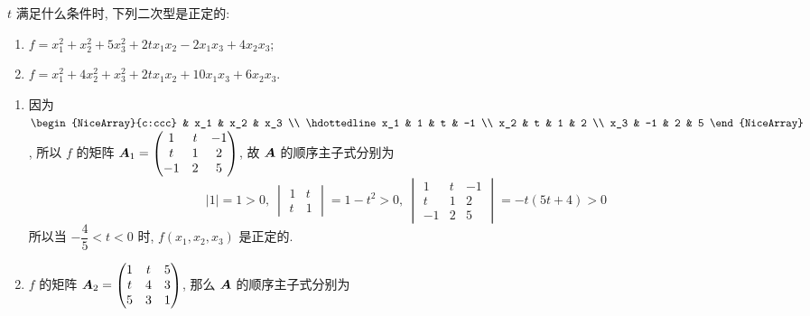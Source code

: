 \begin{example}
    $t$ 满足什么条件时, 下列二次型是正定的:
    \begin{enumerate}[label=(\arabic{*})]
        \item $f=x_1^2+x_2^2+5x_3^2+2tx_1x_2-2x_1x_3+4x_2x_3$;
        \item $f=x_1^2+4x_2^2+x_3^2+2tx_1x_2+10x_1x_3+6x_2x_3$.
    \end{enumerate}
\end{example}
\begin{solution}
    \begin{enumerate}[label=(\arabic{*})]
        \item 因为 $\begin{NiceArray}{c:ccc}
                          & x_1 & x_2 & x_3 \\ \hdottedline
                      x_1 & 1   & t   & -1  \\
                      x_2 & t   & 1   & 2   \\
                      x_3 & -1  & 2   & 5
                  \end{NiceArray}$, 所以 $f$ 的矩阵 $\vb*{A}_1=\begin{pmatrix}
                      1  & t & -1 \\
                      t  & 1 & 2  \\
                      -1 & 2 & 5
                  \end{pmatrix}$, 故 $\vb*{A}$ 的顺序主子式分别为
              $$|1|=1>0,~\begin{vmatrix}
                      1 & t \\
                      t & 1
                  \end{vmatrix}=1-t^2>0,~\begin{vmatrix}
                      1  & t & -1 \\
                      t  & 1 & 2  \\
                      -1 & 2 & 5
                  \end{vmatrix}=-t(5t+4)>0$$
              所以当 $-\dfrac{4}{5}<t<0$ 时, $f(x_1,x_2,x_3)$ 是正定的.
        \item $f$ 的矩阵 $\vb*{A}_2=\begin{pmatrix}
                      1 & t & 5 \\
                      t & 4 & 3 \\
                      5 & 3 & 1
                  \end{pmatrix}$, 那么 $\vb*{A}$ 的顺序主子式分别为

\end{enumerate}
\end{solution}
